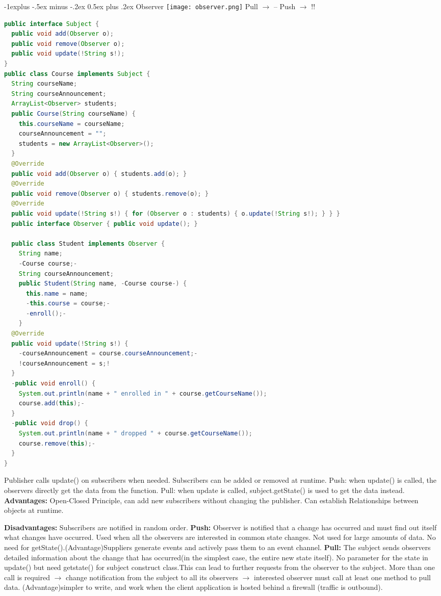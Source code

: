 \documentclass[letterpaper, 8pt]{extarticle}
\makeatletter
\renewcommand{\subsection}{\@startsection{subsection}{2}{0mm}%
                                {-1explus -.5ex minus -.2ex}%
                                {0.5ex plus .2ex}%
                                {\normalfont\small\bfseries}}
\makeatother
\begin{document}
\begin{multicols*}{5}
  \subsection{Observer}
  \texttt{[image: observer.png]}
  Pull $\rightarrow$ --
  Push $\rightarrow$ !!
  \begin{lstlisting}[language=Java, breaklines=true]
public interface Subject {
  public void add(Observer o);
  public void remove(Observer o);
  public void update(!String s!);
}
public class Course implements Subject {
  String courseName;
  String courseAnnouncement;
  ArrayList<Observer> students;
  public Course(String courseName) {
    this.courseName = courseName;
    courseAnnouncement = "";
    students = new ArrayList<Observer>();
  }
  @Override
  public void add(Observer o) { students.add(o); }
  @Override
  public void remove(Observer o) { students.remove(o); }
  @Override
  public void update(!String s!) { for (Observer o : students) { o.update(!String s!); } } }
  public interface Observer { public void update(); }
  
  public class Student implements Observer {
    String name;
    -Course course;-
    String courseAnnouncement;
    public Student(String name, -Course course-) {
      this.name = name;
      -this.course = course;-
      -enroll();-
    }
  @Override
  public void update(!String s!) {
    -courseAnnouncement = course.courseAnnouncement;-
    !courseAnnouncement = s;!
  }
  -public void enroll() {
    System.out.println(name + " enrolled in " + course.getCourseName());
    course.add(this);-
  }
  -public void drop() {
    System.out.println(name + " dropped " + course.getCourseName());
    course.remove(this);-
  }
}
  \end{lstlisting}
  Publisher calls update() on subscribers when needed. Subscribers can be added or removed at runtime. Push: when update() is called, the observers directly get the data from the function. Pull: when update is called, subject.getState() is used to get the data instead.
  \textbf{Advantages:} Open-Closed Principle, can add new subscribers without changing the publisher.
  Can establish Relationships between objects at runtime.

  \textbf{Disadvantages:} Subscribers are notified in random order.
  \textbf{Push:} Observer is notified that a change has occurred and must find out itself what changes have occurred. Used when all the observers are interested in common state changes. Not used for large amounts of data. No need for getState().(Advantage)Suppliers generate events and actively pass them to an event channel. 
  \textbf{Pull:} The subject sends observers detailed information about the change that has occurred(in the simplest case, the entire new state itself). No parameter for the state in update() but need getstate() for subject construct class.This can lead to further requests from the observer to the subject. More than one call is required $\rightarrow$ change notification from the subject to all its observers $\rightarrow$ interested observer must call at least one method to pull data. (Advantage)simpler to write, and work when the client application is hosted behind a firewall (traffic is outbound). 


\end{multicols*}
\end{document}

